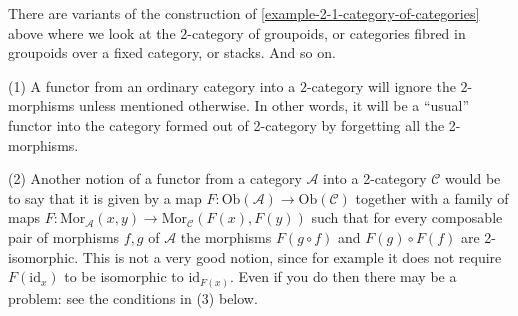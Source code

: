\begin{remark}
\label{remark-other-2-categories}
There are variants of the construction of
\ref{example-2-1-category-of-categories} above
where we look at the $2$-category of groupoids,
or categories fibred in groupoids over a fixed
category, or stacks. And so on.
\end{remark}

\begin{remarks}
\label{remarks-functor-into-2-category}
(1) A functor from an ordinary category into a $2$-category will ignore the
$2$-morphisms unless mentioned otherwise. In other words, it will be a 
``usual'' functor into the category formed out of 2-category by forgetting
all the 2-morphisms.

\medskip\noindent
(2) Another notion of a functor from a category $\mathcal{A}$ into a
2-category $\mathcal{C}$ would be to say that it is given by a map
$F : \text{Ob}(\mathcal{A}) \to \text{Ob}(\mathcal{C})$ together with a
family of maps 
$F : \text{Mor}_{\mathcal{A}}(x,y) \to \text{Mor}_{\mathcal{C}}(F(x),F(y))$
such that for every composable pair of morphisms $f,g$ of $\mathcal{A}$
the morphisms $F(g \circ f)$ and $F(g) \circ F(f)$ are 2-isomorphic. This is
not a very good notion, since for example it does not require $F(\text{id}_x)$
to be isomorphic to $\text{id}_{F(x)}$. Even if you do then
there may be a problem: see the conditions in (3) below.


\end{remarks}
